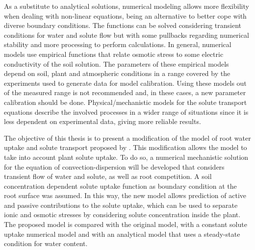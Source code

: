 As a substitute to analytical solutions, numerical modeling allows more flexibility when dealing with non-linear equations, being an alternative to better cope with diverse boundary conditions. 
The functions can be solved considering transient conditions for water and solute flow but with some pullbacks regarding numerical stability and more processing to perform calculations.
In general, numerical models use empirical functions that relate osmotic stress to some electric conductivity of the soil solution. 
The parameters of these empirical models depend on soil, plant and atmospheric conditions in a range covered by the experiments used to generate data for model calibration. 
Using these models out of the measured range is not recommended and, in these cases, a new parameter calibration should be done.
Physical/mechanistic models for the solute transport equations describe the involved processes in a wider range of situations since it is less dependent on experimental data, giving more reliable results.


The objective of this thesis is to present a modification of the model of root water uptake and solute transport proposed by \citeonline[liersolute].
This modification allows the model to take into account plant solute uptake.
To do so, a numerical mechanistic solution for the equation of convection-dispersion will be developed that considers transient flow of water and solute, as well as root competition.
A soil concentration dependent solute uptake function as boundary condition at the root surface was assumed.
In this way, the new model allows prediction of active and passive contributions to the solute uptake, which can be used to separate ionic and osmotic stresses by considering solute concentration inside the plant. 
The proposed model is compared with the original model, with a constant solute uptake numerical model and with an analytical model that uses a steady-state condition for water content. 
